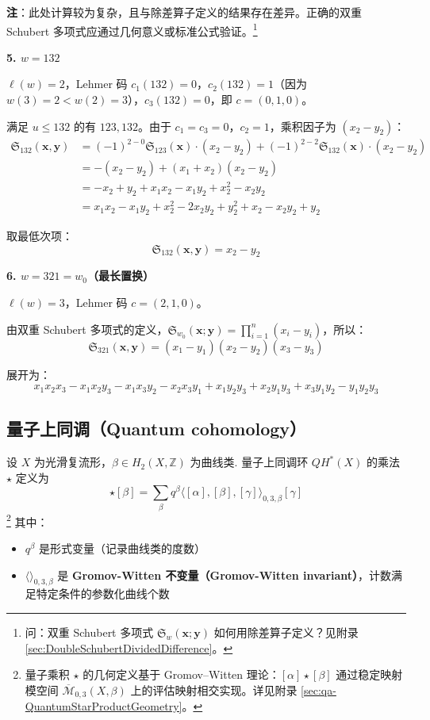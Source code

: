 \begin{Example}[$S_3$ 的计算]
\textbf{注}：此处计算较为复杂，且与除差算子定义的结果存在差异。正确的双重 Schubert 多项式应通过几何意义或标准公式验证。\footnote{问：双重 Schubert 多项式 $\mathfrak{S}_w(\mathbf{x};\mathbf{y})$ 如何用除差算子定义？见附录 \cref{sec:DoubleSchubertDividedDifference}。}

\textbf{5. $w = 132$}

$\ell(w) = 2$，Lehmer 码 $c_1(132) = 0$，$c_2(132) = 1$（因为 $w(3)=2 < w(2)=3$），$c_3(132) = 0$，即 $c = (0,1,0)$。

满足 $u \leq 132$ 的有 $123, 132$。由于 $c_1 = c_3 = 0$，$c_2 = 1$，乘积因子为 $(x_2-y_2)$：
\begin{align*}
\mathfrak{S}_{132}(\mathbf{x},\mathbf{y}) &= (-1)^{2-0} \mathfrak{S}_{123}(\mathbf{x}) \cdot (x_2-y_2) + (-1)^{2-2} \mathfrak{S}_{132}(\mathbf{x}) \cdot (x_2-y_2) \\
&= -(x_2-y_2) + (x_1+x_2)(x_2-y_2) \\
&= -x_2 + y_2 + x_1 x_2 - x_1 y_2 + x_2^2 - x_2 y_2 \\
&= x_1 x_2 - x_1 y_2 + x_2^2 - 2x_2 y_2 + y_2^2 + x_2 - x_2 y_2 + y_2
\end{align*}

取最低次项：
$$\mathfrak{S}_{132}(\mathbf{x},\mathbf{y}) = x_2 - y_2$$

\textbf{6. $w = 321 = w_0$（最长置换）}

$\ell(w) = 3$，Lehmer 码 $c = (2,1,0)$。

由双重 Schubert 多项式的定义，$\mathfrak{S}_{w_0}(\mathbf{x};\mathbf{y}) = \prod_{i=1}^n (x_i - y_i)$，所以：
$$\mathfrak{S}_{321}(\mathbf{x},\mathbf{y}) = (x_1 - y_1)(x_2 - y_2)(x_3 - y_3)$$

展开为：
$$x_1 x_2 x_3 - x_1 x_2 y_3 - x_1 x_3 y_2 - x_2 x_3 y_1 + x_1 y_2 y_3 + x_2 y_1 y_3 + x_3 y_1 y_2 - y_1 y_2 y_3$$
\end{Example}

\subsection{量子上同调（Quantum cohomology）}
\label{sec:QuantumCohomologyMain}

\begin{Definition}[量子上同调]
\label{def:QuantumCohomology}
设 $X$ 为光滑复流形，$\beta \in H_2(X,\mathbb{Z})$ 为曲线类. 量子上同调环 $QH^*(X)$ 的乘法 $\star$ 定义为
\begin{equation}
[\alpha] \star [\beta] = \sum_{\beta} q^{\beta} \langle [\alpha], [\beta], [\gamma] \rangle_{0,3,\beta} [\gamma]
\end{equation}\footnote{量子乘积 $\star$ 的几何定义基于 Gromov--Witten 理论：$[\alpha] \star [\beta]$ 通过稳定映射模空间 $\overline{\mathcal{M}}_{0,3}(X,\beta)$ 上的评估映射相交实现。详见附录 \cref{sec:qa-QuantumStarProductGeometry}。}
其中：
\begin{itemize}
\item $q^{\beta}$ 是形式变量（记录曲线类的度数）
\item $\langle \rangle_{0,3,\beta}$ 是 \textbf{Gromov-Witten 不变量（Gromov-Witten invariant）}，计数满足特定条件的参数化曲线个数
\end{itemize}
\end{Definition}

